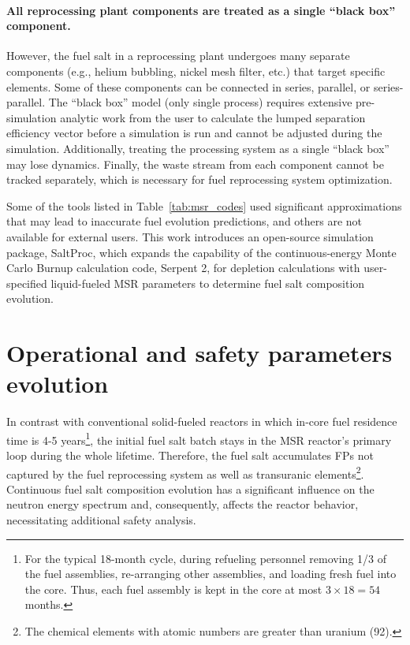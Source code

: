 \paragraph{All reprocessing plant components are treated as a single ``black 
	box'' component.} However, the fuel salt in a reprocessing plant undergoes 
many separate components (e.g., helium bubbling, nickel mesh filter, etc.) 
that target specific elements. Some of these components can be connected in 
series, parallel, or series-parallel. The ``black box'' model (only single 
process) requires extensive pre-simulation analytic work from the user to 
calculate the lumped separation efficiency vector before a simulation is run 
and cannot be adjusted during the simulation. Additionally, treating the 
processing system as a single ``black box'' may lose dynamics. Finally, the 
waste stream from each component cannot be tracked separately, which is 
necessary for fuel reprocessing system optimization.

Some of the tools listed in Table~\ref{tab:msr_codes} used significant  
approximations that may lead to inaccurate fuel evolution predictions, and 
others are not available for external users. This work introduces an 
open-source simulation package, SaltProc, which expands the capability of the 
continuous-energy Monte Carlo Burnup calculation code, Serpent 2, for 
depletion calculations with user-specified liquid-fueled \gls{MSR} parameters 
to determine fuel salt composition evolution.

\section{Operational and safety parameters evolution} 
\label{sec:saf-par-literature}
In contrast with conventional solid-fueled reactors in which in-core fuel 
residence time is 4-5 years\footnote{For the typical 18-month cycle, during 
refueling personnel removing 1/3 of the fuel assemblies, re-arranging other 
assemblies, and loading fresh fuel into the core. Thus, each fuel assembly is 
kept in the core at most $3\times 18=54$ months.}, the initial fuel salt batch 
stays in the \gls{MSR} reactor's primary loop during the whole lifetime. 
Therefore, the fuel salt accumulates \glspl{FP} not captured by the fuel 
reprocessing system as well as transuranic elements\footnote{The chemical 
elements with atomic numbers are greater than uranium (92).}. Continuous fuel 
salt composition evolution has a significant influence on the neutron energy 
spectrum and, consequently, affects the reactor behavior, necessitating 
additional safety analysis.

